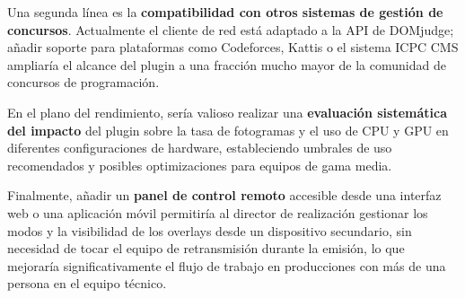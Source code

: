 Una segunda línea es la \textbf{compatibilidad con otros sistemas de gestión de concursos}. Actualmente el cliente de red está adaptado a la API de DOMjudge; añadir soporte para plataformas como Codeforces, Kattis o el sistema ICPC CMS ampliaría el alcance del plugin a una fracción mucho mayor de la comunidad de concursos de programación.

En el plano del rendimiento, sería valioso realizar una \textbf{evaluación sistemática del impacto} del plugin sobre la tasa de fotogramas y el uso de CPU y GPU en diferentes configuraciones de hardware, estableciendo umbrales de uso recomendados y posibles optimizaciones para equipos de gama media.

Finalmente, añadir un \textbf{panel de control remoto} accesible desde una interfaz web o una aplicación móvil permitiría al director de realización gestionar los modos y la visibilidad de los overlays desde un dispositivo secundario, sin necesidad de tocar el equipo de retransmisión durante la emisión, lo que mejoraría significativamente el flujo de trabajo en producciones con más de una persona en el equipo técnico.
